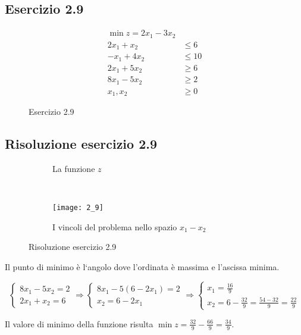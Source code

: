 \documentclass[\main/main.tex]{subfiles}
\begin{document}
\subsection{Esercizio 2.9}

\begin{figure}
  \begin{align*}
    \min z = 2x_1 - 3x_2  \\
    2x_1 + x_2  & \leq 6  \\
    -x_1 + 4x_2 & \leq 10 \\
    2x_1 + 5x_2 & \geq 6  \\
    8x_1 - 5x_2 & \geq 2  \\
    x_1, x_2    & \geq 0
  \end{align*}
  \caption{Esercizio 2.9}
\end{figure}

\subsection{Risoluzione esercizio 2.9}

\begin{figure}
  \begin{subfigure}{0.45\textwidth}
    \caption{La funzione $z$}
  \end{subfigure}
  ~
  \begin{subfigure}{0.45\textwidth}
    \texttt{[image: 2\_9]}
    \caption{I vincoli del problema nello spazio $x_1 - x_2$}
  \end{subfigure}
  \caption{Risoluzione esercizio 2.9}
\end{figure}

Il punto di minimo è l`angolo dove l'ordinata è massima e l'ascissa minima.

\[
  \begin{cases}
    8x_1 - 5x_2 = 2 \\
    2x_1 + x_2 = 6
  \end{cases}
  \Rightarrow
  \begin{cases}
    8x_1 - 5(6 - 2x_1) = 2 \\
    x_2 = 6 - 2x_1
  \end{cases}
  \Rightarrow
  \begin{cases}
    x_1 = \frac{16}{9} \\
    x_2 = 6 - \frac{32}{9} = \frac{54 - 32}{9}  = \frac{22}{9}
  \end{cases}
\]

Il valore di minimo della funzione risulta $\min z = \frac{32}{9} - \frac{66}{9} = \frac{34}{9}$.
\end{document}
